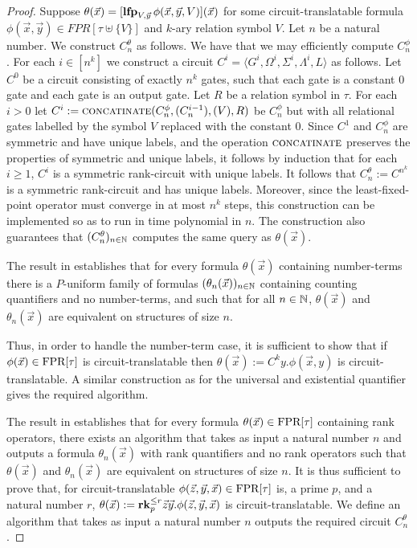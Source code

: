 \documentclass[../paper.tex]{subfiles}
\begin{document}
\begin{proof}
  Suppose $\theta(\vec{x}) = [\text{\textbf{lfp}}_{V, \vec{y}} \, \phi(\vec{x}, \vec{y},
    V) ](\vec{x})$ for some circuit-translatable formula $\phi(\vec{x},
  \vec{y}) \in FPR[\tau \uplus \{V\}]$ and $k$-ary relation symbol $V$. Let $n$
  be a natural number. We construct $C^{\theta}_n$ as follows. We have that we
  may efficiently compute $C^{\phi}_n$. For each $i \in [n^k]$ we construct a
  circuit $C^i = \langle G^i, \Omega^i, \Sigma^i, \Lambda^i, L \rangle $ as
  follows. Let $C^0$ be a circuit consisting of exactly $n^k$ gates, such that
  each gate is a constant $0$ gate and each gate is an output gate. Let $R$ be a
  relation symbol in $\tau$. For each $i > 0$ let $C^i :=
  {\normalfont\textsc{concatinate}}(C^{\phi}_n, (C^{i-1}_n), (V), R)$ be $C^{\phi}_n$ but with
  all relational gates labelled by the symbol $V$ replaced with the constant
  $0$. Since $C^1$ and $C^\phi_n$ are symmetric and have unique labels, and the
  operation ${\normalfont\textsc{concatinate}}$ preserves the properties of symmetric and unique
  labels, it follows by induction that for each $i \geq 1$, $C^i$ is a symmetric
  rank-circuit with unique labels. It follows that $C^{\theta}_n := C^{n^k}$ is
  a symmetric rank-circuit and has unique labels. Moreover, since the
  least-fixed-point operator must converge in at most $n^k$ steps, this
  construction can be implemented so as to run in time polynomial in $n$. The
  construction also guarantees that $(C^{\theta}_n)_{n \in \mathbb{N}}$ computes the
  same query as $\theta(\vec{x})$.

  The result in \cite{} establishes that for every formula $\theta(\vec{x})$
  containing number-terms there is a $P$-uniform family of formulas
  $(\theta_n(\vec{x}))_{n \in \mathbb{N}}$ containing counting quantifiers and no
  number-terms, and such that for all $n \in \mathbb{N}$, $\theta(\vec{x})$ and
  $\theta_n(\vec{x})$ are equivalent on structures of size $n$.
  
  Thus, in order to handle the number-term case, it is sufficient to show that
  if $\phi(\vec{x}) \in \text{\upshape FPR}[\tau]$ is circuit-translatable then
  $\theta(\vec{x}) := C^{k}y. \phi(\vec{x}, y)$ is circuit-translatable.
  A similar construction as for the universal and existential quantifier gives
  the required algorithm.

  The result in \cite{} establishes that for every formula $\theta(\vec{x}) \in
  \text{\upshape FPR}[\tau]$ containing rank operators, there exists an algorithm that takes as
  input a natural number $n$ and outputs a formula $\theta_n(\vec{x})$ with rank
  quantifiers and no rank operators such that $\theta(\vec{x})$ and
  $\theta_n(\vec{x})$ are equivalent on structures of size $n$. It is thus
  sufficient to prove that, for circuit-translatable $\phi(\vec{z},
  \vec{y}, \vec{x}) \in \text{\upshape FPR}[\tau]$ is, a prime $p$, and a natural number $r$,
  $\theta(\vec{x}) := \text{\textbf{rk}}^{\leq r}_p \vec{z} \vec{y}. \phi(\vec{z}, \vec{y},
  \vec{x})$ is circuit-translatable. We define an algorithm that takes as input
  a natural number $n$ outputs the required circuit $C^{\theta}_n$.


\end{proof}
\end{document}
